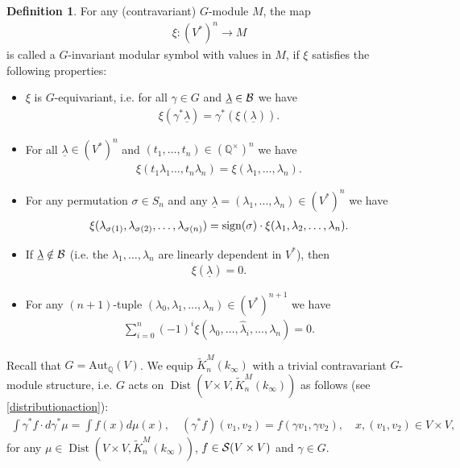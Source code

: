 \documentclass[12pt,amstex,amssymb]{article}
\theoremstyle{plain}
\theoremstyle{definition}
\newtheorem{definition}[theorem]{Definition}
\def\g{\gamma}
\def\cB{{\cal B}}
\def\cK{{\cal K}}
\def\cS{{\cal S}}
\def\Q{{\mathbb Q}}
\def\Aut{\text{Aut}}
\def\ulambda {{\underline{\lambda}}}
\def\sign {{\rm sign}}
\def\g{\gamma}
\newcommand{\be}{\begin{eqnarray*}}
\newcommand{\ee}{\end{eqnarray*}}
\newcommand{\bea}{\begin{eqnarray}}
\newcommand{\eea}{\end{eqnarray}}
\newcommand{\Dist}{\operatorname{Dist}}
\begin{document}
\begin{definition}\cite{AR}\label{AR}
For any (contravariant) $G$-module $M$, the map 
\be
\xi:  (V^*)^n \to M
\ee
 is called a $G$-invariant modular symbol with values in $M$, if $\xi$ satisfies the following properties:
\begin{itemize}
\item $\xi$ is $G$-equivariant, i.e. for all $\gamma\in G$ and $\ulambda\in \cB$ we have 
\bea \label{one}
\xi({\gamma^\ast \ulambda}) = \gamma^\ast \left( \xi(\ulambda)\right).
\eea
\item For all $\ulambda \in \left(V^*\right)^n$ and $(t_1,\ldots, t_n)\in \left(\Q^\times\right)^n$ we have
\bea \label{two}
\xi(t_1\lambda_1\ldots, t_n\lambda_n) = \xi(\lambda_1,\ldots,\lambda_n).
\eea
\item For any permutation $\sigma \in S_n$ and any $\ulambda = (\lambda_1,\ldots,\lambda_n) \in \left(V^*\right)^n$ we have
\bea \label{three}
\xi(\lambda_{\sigma(1)},\lambda_{\sigma(2)},\ldots, \lambda_{\sigma(n)}) = \sign(\sigma)\cdot 
\xi(\lambda_1, \lambda_2,\ldots,\lambda_n).
\eea
\item If $\ulambda\notin \cB$ (i.e. the $\lambda_1,\ldots,\lambda_n$ are linearly dependent in $V^*$), 
then 
\bea \label{five}
\xi(\ulambda)=0.
\eea
\item  For any $(n+1)$-tuple $(\lambda_0,\lambda_1,\ldots,\lambda_n) \in \left(V^*\right)^{n+1}$ we have
\bea \label{four}
\sum_{i=0}^n (-1)^i\xi(\lambda_0,\ldots,\hat \lambda_i,\ldots,\lambda_n) = 0.
\eea
\end{itemize}
\end{definition}




Recall that $G=\Aut_\Q(V)$. We equip $\tilde K^M_n(k_\infty)$ with a trivial contravariant $ G$-module structure, i.e. $G$ acts on $\Dist(V \times  V, \tilde K^M_n(k_\infty))$ as follows (see \eqref{distributionaction}):
\bea \label{taction}
\int \gamma^\ast f \cdot d\gamma^\ast\mu = \int f(x)d\mu(x), \quad (\g^\ast f)(v_1, v_2) = f(\g v_1, \g v_2), \quad x, (v_1,v_2) \in V \times V,
\eea
for any $\mu\in \Dist(V\times V,\tilde K^M_n(k_\infty))$, $f\in \cS(V\times V)$ and $ \gamma\in  G$.
\end{document}
